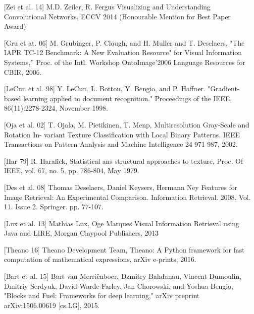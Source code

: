 [Zei et al. 14] M.D. Zeiler, R. Fergus Visualizing and Understanding Convolutional Networks, ECCV 2014 (Honourable Mention for Best Paper Award)

[Gru et at. 06] M. Grubinger, P. Clough, and H. Muller and T. Deselaers, "The IAPR TC-12 Benchmark: A New Evaluation Resource" for Visual Information Systems,” Proc. of the Intl. Workshop OntoImage’2006 Language Resources for CBIR, 2006.


[LeCun et al. 98] Y. LeCun, L. Bottou, Y. Bengio, and P. Haffner. "Gradient-based learning applied to document recognition." Proceedings of the IEEE, 86(11):2278-2324, November 1998. 

[Oja et al. 02] T. Ojala, M. Pietikinen, T. Menp, Multiresolution Gray-Scale and Rotation In-
variant Texture Classification with Local Binary Patterns. IEEE Transactions on
Pattern Analysis and Machine Intelligence 24 971 987, 2002.

[Har 79] R. Haralick, Statistical ans structural approaches to texture, Proc. Of IEEE, vol.
67, no. 5, pp. 786-804, May 1979.

[Des et al. 08] Thomas Deselaers, Daniel Keysers, Hermann Ney Features for Image Retrieval: An Experimental Comparison. Information Retrieval. 2008. Vol. 11. Issue 2. Springer. pp. 77-107.

[Lux et al. 13] Mathias Lux, Oge Marques Visual Information Retrieval using Java and LIRE, Morgan Claypool Publishers, 2013


[Theano 16] Theano Development Team, Theano: A {Python} framework for fast computation of mathematical expressions, arXiv e-prints, 2016.

[Bart et al. 15] Bart van Merriënboer, Dzmitry Bahdanau, Vincent Dumoulin, Dmitriy Serdyuk, David Warde-Farley, Jan Chorowski, and Yoshua Bengio, "Blocks and Fuel: Frameworks for deep learning," arXiv preprint arXiv:1506.00619 [cs.LG], 2015.